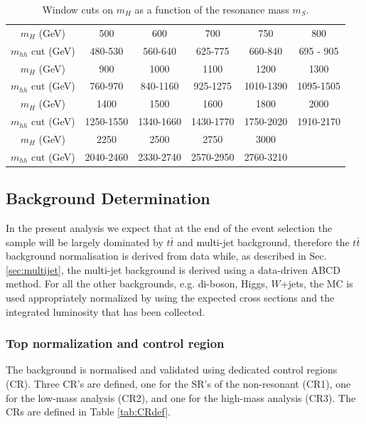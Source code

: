 \begin{table}
\begin{center}
\begin{tabular}{c|c|c|c|c|c}
$m_{H}$ (GeV)      &   500   &   600   &   700   &   750   &   800 \\
$m_{hh}$ cut (GeV) & 480-530 & 560-640 & 625-775 & 660-840 & 695 - 905 \\ 
\hline 
$m_{H}$ (GeV)      &  900   &   1000  	   &  1100   	&  1200   		&   1300    \\
$m_{hh}$ cut (GeV) & 760-970	& 840-1160 & 925-1275	&1010-1390	&1095-1505  \\
\hline 
$m_{H}$ (GeV)      &   1400  		&  1500   		&  1600   		& 1800  		& 2000\\
$m_{hh}$ cut (GeV) &1250-1550	&1340-1660	&1430-1770	& 1750-2020 	& 1910-2170\\
\hline

\hline 
$m_{H}$ (GeV)      &   2250  		&  2500   		&  2750   		& 3000  		& \\
$m_{hh}$ cut (GeV) &2040-2460	&2330-2740	&2570-2950	& 2760-3210 	& \\
\end{tabular}
\caption[Window cuts on ${m_HH}$]{Window cuts on $m_{H}$ as a function of the resonance mass
  $m_{S}$.}
\label{tab:mhh_sig_cuts}
\end{center}
\end{table}


\subsection{Background Determination}
In the present analysis we expect that at the end of the event selection the
sample will be largely dominated by $t \bar{t}$ and multi-jet background, therefore the $t\bar{t}$ background normalisation
is derived from data while, as described in Sec. \ref{sec:multijet}, the multi-jet
background is derived using a data-driven ABCD method.
For all the other backgrounds, e.g. di-boson, Higgs, $W$+jets, the
MC is used appropriately normalized by using the expected cross sections and the
integrated luminosity that has been collected.

\subsubsection{Top normalization and control region}
\label{subsec:topCR}
The \ttbar background is normalised and validated using  dedicated
control regions (CR). Three CR's are defined, one for the SR's of the non-resonant (CR1), one for the low-mass analysis (CR2), and one for the high-mass analysis (CR3).  The CRs are defined in Table \ref{tab:CRdef}.


